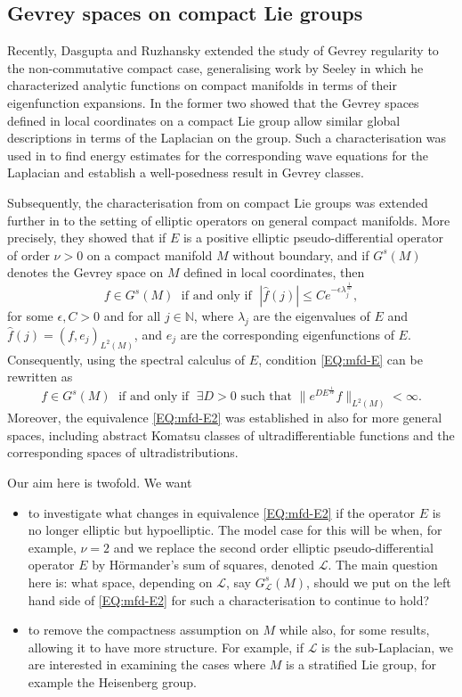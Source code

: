 \documentclass[12pt,oneside,a4paper]{book}
\numberwithin{equation}{section}     %
\theoremstyle{plain}
\theoremstyle{definition}
\newcommand{\N}{{\mathbb N}}
\newcommand{\slp}{{\mathcal L}}
\begin{document}
\subsection{Gevrey spaces on compact Lie groups}
Recently, Dasgupta and Ruzhansky extended the study of Gevrey regularity to the non-commutative compact case, generalising work by Seeley \cite{S1969} in which he characterized analytic functions on compact manifolds in terms of their eigenfunction expansions. In \cite{DR2014} the former two showed that the Gevrey spaces defined in local coordinates on a compact Lie group allow similar global descriptions in terms of the Laplacian on the group. Such a characterisation was used in \cite{GR2015} to find energy estimates for the corresponding wave equations for the Laplacian and establish a well-posedness result in Gevrey classes.

Subsequently, the characterisation from \cite{DR2014} on compact Lie groups was extended further in \cite{DR2016} to the setting of elliptic operators on general compact manifolds. More precisely, they showed that if $E$ is a positive elliptic pseudo-differential operator of order $\nu>0$ on a compact manifold $M$ without boundary, and if  $G^s(M)$ denotes the Gevrey space on $M$ defined in local coordinates, then 
\begin{equation}\label{EQ:mfd-E}
f\in G^s(M)\;\textrm{ if and only if }\; |\widehat{f}(j)|\leq C e^{-\epsilon \lambda_j^{\frac{1}{s\nu}}},
\end{equation}
for some $\epsilon, C>0$ and for all $j\in\N$, where $\lambda_j$ are the eigenvalues of $E$ and 
$\widehat{f}(j)=(f,e_j)_{L^2(M)}$, and $e_j$ are the corresponding eigenfunctions of $E$. Consequently, using the spectral calculus of $E$, condition \eqref{EQ:mfd-E} can be rewritten as
\begin{equation}\label{EQ:mfd-E2}
f\in G^s(M)\;\textrm{ if and only if }\; \exists D>0\textrm{ such that }
\| e^{D E^{\frac{1}{s\nu}}} f\|_{L^2(M)}<\infty. 
\end{equation}
Moreover, the equivalence \eqref{EQ:mfd-E2} was established in \cite{DR2016} also for more general spaces, including abstract Komatsu classes of ultradifferentiable functions and the corresponding spaces of ultradistributions.

Our aim here is twofold. We want
\begin{itemize}
	\item to investigate what changes in equivalence \eqref{EQ:mfd-E2} if the operator $E$ is no longer elliptic but hypoelliptic. The model case for this will be when, for example, $\nu=2$ and we replace the second order elliptic pseudo-differential operator $E$ by H\"ormander's sum of squares, denoted $\slp$. The main question here is: what space, depending on $\slp$, say $G^s_\slp(M)$, should we put on the left hand side of \eqref{EQ:mfd-E2} for such a characterisation to continue to hold?
	\item to remove the compactness assumption on $M$ while also, for some results, allowing it to have more structure. For example, if $\slp$ is the sub-Laplacian, we are interested in examining the cases where $M$ is a stratified Lie group, for example the Heisenberg group.
\end{itemize}
\end{document}
